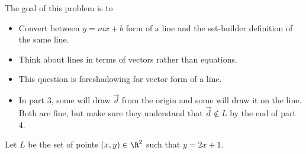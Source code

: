 \documentclass{problemset}
\begin{document}
	\question
	\begin{annotation}
		\begin{goals}

			The goal of this problem is to
			\begin{itemize}
				\item Convert between $y=mx+b$ form of a line and
					the set-builder definition of the same line.
				\item Think about lines in terms of vectors rather
					than equations.
			\end{itemize}
		\end{goals}

		\begin{notes}
			\begin{itemize}
				\item This question is foreshadowing for vector form of a line.
				\item In part 3, some will draw $\vec d$ from the origin and
					some will draw it on the line. Both are fine, but make
					sure they understand that $\vec d\notin L$ by the end of
					part 4.
			\end{itemize}
		\end{notes}
	\end{annotation}
	Let $L$ be the set of points $(x,y)\in\R^2$ such that $y=2x+1$.
\end{document}
